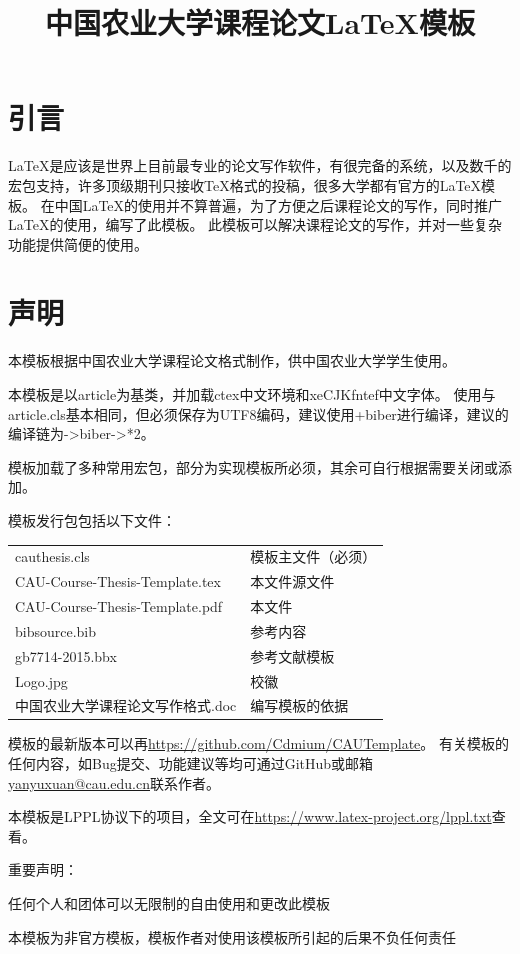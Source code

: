 \documentclass[twoside,maketable]{cauthesis}
\title{中国农业大学课程论文\LaTeX{}模板}%
\date{}%
\author{}%
\begin{document}
    \section{引言}
    \LaTeX{}是应该是世界上目前最专业的论文写作软件，有很完备的系统，以及数千的宏包支持，许多顶级期刊只接收\TeX{}格式的投稿，很多大学都有官方的\LaTeX{}模板。
    在中国\LaTeX{}的使用并不算普遍，为了方便之后课程论文的写作，同时推广\LaTeX{}的使用，编写了此模板。
    此模板可以解决课程论文的写作，并对一些复杂功能提供简便的使用。
    \section{声明}
    本模板根据中国农业大学课程论文格式制作，供中国农业大学学生使用。

    本模板是以article为基类，并加载ctex中文环境和xeCJKfntef中文字体。
    使用与article.cls基本相同，但必须保存为UTF8编码，建议使用\XeLaTeX{}+biber进行编译，建议的编译链为\XeLaTeX{}->biber->\XeLaTeX{}*2。

    模板加载了多种常用宏包，部分为实现模板所必须，其余可自行根据需要关闭或添加。

    模板发行包包括以下文件：

    \begin{table}[H]
        \begin{tabular}{ll}
            cauthesis.cls&模板主文件（必须）\\
            CAU-Course-Thesis-Template.tex&本文件源文件\\
            CAU-Course-Thesis-Template.pdf&本文件\\
            bibsource.bib&参考内容\\
            gb7714-2015.bbx&参考文献模板\\
            Logo.jpg&校徽\\
            中国农业大学课程论文写作格式.doc&编写模板的依据
        \end{tabular}
    \end{table}
    
    模板的最新版本可以再\url{https://github.com/Cdmium/CAUTemplate}。
    有关模板的任何内容，如Bug提交、功能建议等均可通过GitHub或邮箱\url{yanyuxuan@cau.edu.cn}联系作者。

    本模板是LPPL协议下的项目，全文可在\url{https://www.latex-project.org/lppl.txt}查看。

    重要声明：
    \begin{level}{1}
        \item 任何个人和团体可以无限制的自由使用和更改此模板
        \item 本模板为非官方模板，模板作者对使用该模板所引起的后果不负任何责任
    \end{level}
\end{document}
